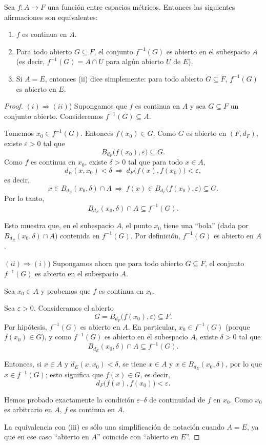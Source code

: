 \begin{teo}
Sea $f : A \to F$ una función entre espacios métricos. Entonces las
siguientes afirmaciones son equivalentes:
\begin{enumerate}[label=(\roman*)]
    \item $f$ es continua en $A$.
    \item Para todo abierto $G \subseteq F$, el conjunto
    $f^{-1}(G)$ es abierto en el subespacio $A$ (es decir,
    $f^{-1}(G) = A \cap U$ para algún abierto $U$ de $E$).
    \item Si $A = E$, entonces (ii) dice simplemente:
    para todo abierto $G \subseteq F$, $f^{-1}(G)$ es abierto en $E$.
\end{enumerate}
\end{teo}

\begin{proof}
$(i) \Rightarrow (ii)$) Supongamos que $f$ es continua en $A$ y sea
$G \subseteq F$ un conjunto abierto. Consideremos $f^{-1}(G) \subseteq A$.

Tomemos $x_0 \in f^{-1}(G)$. Entonces $f(x_0) \in G$. Como $G$ es abierto
en $(F,d_F)$, existe $\varepsilon > 0$ tal que
\[
B_{d_F}\bigl(f(x_0),\varepsilon\bigr) \subseteq G.
\]
Como $f$ es continua en $x_0$, existe $\delta > 0$ tal que para todo
$x \in A$,
\[
d_E(x,x_0) < \delta \ \Rightarrow\ d_F\bigl(f(x),f(x_0)\bigr) < \varepsilon,
\]
es decir,
\[
x \in B_{d_E}(x_0,\delta) \cap A \ \Rightarrow\ f(x) \in
B_{d_F}\bigl(f(x_0),\varepsilon\bigr) \subseteq G.
\]
Por lo tanto,
\[
B_{d_E}(x_0,\delta) \cap A \subseteq f^{-1}(G).
\]

Esto muestra que, en el subespacio $A$, el punto $x_0$ tiene una “bola”
(dada por $B_{d_E}(x_0,\delta) \cap A$) contenida en $f^{-1}(G)$.
Por definición, $f^{-1}(G)$ es abierto en $A$.

\medskip

$(ii) \Rightarrow (i)$) Supongamos ahora que para todo abierto $G \subseteq F$,
el conjunto $f^{-1}(G)$ es abierto en el subespacio $A$.

Sea $x_0 \in A$ y probemos que $f$ es continua en $x_0$.

Sea $\varepsilon>0$. Consideramos el abierto
\[
G = B_{d_F}\bigl(f(x_0),\varepsilon\bigr) \subseteq F.
\]
Por hipótesis, $f^{-1}(G)$ es abierto en $A$. En particular,
$x_0 \in f^{-1}(G)$ (porque $f(x_0) \in G$), y como $f^{-1}(G)$ es abierto
en el subespacio $A$, existe $\delta>0$ tal que
\[
B_{d_E}(x_0,\delta) \cap A \subseteq f^{-1}(G).
\]

Entonces, si $x \in A$ y $d_E(x,x_0) < \delta$, se tiene $x \in A$ y
$x \in B_{d_E}(x_0,\delta)$, por lo que $x \in f^{-1}(G)$; esto significa
que $f(x) \in G$, es decir,
\[
d_F\bigl(f(x),f(x_0)\bigr) < \varepsilon.
\]

Hemos probado exactamente la condición $\varepsilon$--$\delta$ de continuidad
de $f$ en $x_0$. Como $x_0$ es arbitrario en $A$, $f$ es continua en $A$.

\medskip

La equivalencia con (iii) es sólo una simplificación de notación cuando
$A=E$, ya que en ese caso “abierto en $A$” coincide con “abierto en $E$”.
\end{proof}

